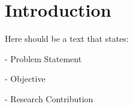 \chapter{Introduction} %

\label{Introduction} %


Here should be a text that states:

- Problem Statement

- Objective

- Research Contribution

